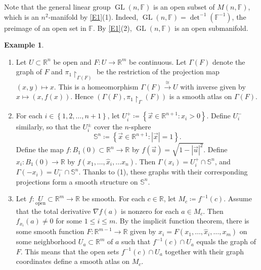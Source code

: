 \documentclass[10pt,letterpaper,cm]{nupset}
\theoremstyle{definition}
\newtheorem{exmp}[definition]{Example}
\theoremstyle{theorem}
\theoremstyle{remark}
\newcommand{\F}{\mathbb F}
\newcommand{\R}{\mathbb R}
\renewcommand{\S}{\mathbb S}
\newcommand{\1}{\mathbf{1}}
\renewcommand{\u}{\vec u}
\newcommand{\x}{\vec x}
\newcommand{\0}{\vec 0}
\DeclareMathOperator{\GL}{GL}
\begin{document}
Note that  the general linear group $\GL(n, \F)$ is an open subset of $M(n, \F)$, which is an $n^2$-manifold by \cref{E1}(1). Indeed, $\GL(n, \F) = \det^{-1}(\F^{-1})$, the preimage of an open set in $\F$. By \cref{E1}(2), $\GL(n, \F)$ is an open submanifold.

\begin{exmp} $ $
\begin{enumerate}[label=(\arabic*)]
\item Let $U\subset \R^n$ be open and $F: U \to \R^m$ be continuous. Let $\Gamma(F)$ denote the graph of $F$ and $\pi_1\restriction_{\Gamma(F)}$ be the restriction of the projection map $\left(x, y\right)\mapsto x$. This is a homeomorphism $\Gamma(F) \overset{\cong}{\longrightarrow} U$ with inverse given by $x \mapsto \left(x, f(x)\right)$. Hence $\left( \Gamma(F), \pi_1 \restriction_\Gamma(F)\right)$ is a smooth atlas on $\Gamma(F)$.
\item For each $i \in \left\{1, 2, \ldots, n+1\right\}$, let $U_i^+ \coloneqq  \left\{ \x \in \R^{n+1}: x_i >0\right\}$. Define $U_i^-$ similarly, so that the $U_i^{\pm}$ cover the $n$-sphere $$\S^n \coloneqq \left\{\x \in \R^{n+1} : \left\lvert{\x}\right\rvert = 1\right\}. $$ Define the map $f: B_1(0)\subset \R^n \to \R$ by $f(\u) = \sqrt{1 - \left\lvert{\u}\right\rvert^2}$. Define $x_i: B_1(0) \to \R$ by $f(x_1, \ldots, \hat{x}_i, \ldots x_n)$.  Then $\Gamma(x_i) = U_i^+ \cap \S^n$, and $\Gamma({-x_i}) = U_i^- \cap \S^n$. Thanks to (1), these graphs with their corresponding projections form a smooth structure on $\S^n$.
\item 
Let $f: \underset{\text{open}}U\subset \R^m \to \R$ be smooth. For each $c \in \R$, let $M_c\coloneqq f^{-1}(c)$. Assume that the total derivative $\nabla f(a)$ is nonzero for each $a \in M_c$.  Then $f_{x_i}(a) \ne 0$ for some $1 \leq i \leq m$. By the implicit function theorem, there is some smooth function $F: \R^{m-1} \to \R$ given by $x_i = F(x_1, \ldots, \hat{x}_i, \ldots, x_m)$ on some neighborhood $U_a\subset \R^m$ of $a$ such that $f^{-1}(c) \cap U_a$ equals the graph of $F$.  This means that the open sets $f^{-1}(c) \cap U_a$ together with their graph coordinates define a smooth atlas on $M_c$.
\end{enumerate}
\end{exmp}
\end{document}
